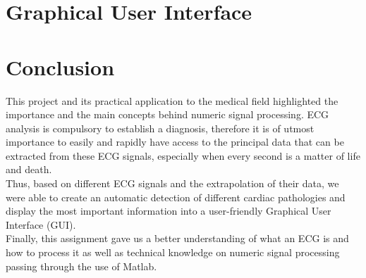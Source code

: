 \documentclass[11pt]{article}
\begin{document}
\section{Graphical User Interface}

\section{Conclusion}
	This project and its practical application to the medical field highlighted the importance and the main concepts behind numeric signal processing. ECG analysis is compulsory to establish a diagnosis, therefore it is of utmost importance to easily and rapidly have access to the principal data that can be extracted from these ECG signals, especially when every second is a matter of life and death.\\
	Thus, based on different ECG signals and the extrapolation of their data, we were able to create an automatic detection of different cardiac pathologies and display the most important information into a user-friendly Graphical User Interface (GUI).\\
	Finally, this assignment gave us a better understanding of what an ECG is and how to process it as well as technical knowledge on numeric signal processing passing through the use of Matlab.\\
\end{document}
